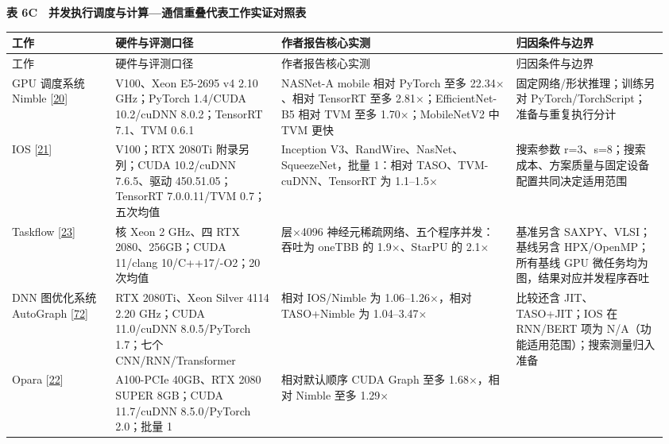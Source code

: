 \documentclass[UTF8,10.5pt,fontset=windows]{ctexart}
\newcommand{\TableTitle}[1]{\par\Needspace{5\baselineskip}\begingroup\centering\bfseries\fontsize{9.5}{13}\selectfont #1\par\endgroup\nobreak}
\begin{document}
\begin{landscape}
\begingroup
\fontsize{8.6}{11.8}\selectfont
\setlength{\tabcolsep}{2.5pt}
\setlength{\emergencystretch}{0.5\linewidth}
\renewcommand{\arraystretch}{1.10}
\TableTitle{\textbf{表 6C　并发执行调度与计算---通信重叠代表工作实证对照表}}
\begin{longtable}[c]{@{}>{\raggedright\arraybackslash}p{0.1536\linewidth}
>{\raggedright\arraybackslash}p{0.2400\linewidth}
>{\raggedright\arraybackslash}p{0.3456\linewidth}
>{\raggedright\arraybackslash}p{0.2208\linewidth}@{}}
\toprule
工作 & 硬件与评测口径 & 作者报告核心实测 & 归因条件与边界 \\
\midrule\endfirsthead
\toprule
工作 & 硬件与评测口径 & 作者报告核心实测 & 归因条件与边界 \\
\midrule\endhead
\bottomrule\endfoot
\bottomrule\endlastfoot
GPU 调度系统 Nimble {[}\protect\hyperlink{ref-kwon2020nimble}{20}{]} &
V100、Xeon E5-2695 v4 2.10 GHz；PyTorch 1.4/CUDA 10.2/cuDNN
8.0.2；TensorRT 7.1、TVM 0.6.1 & NASNet-A mobile 相对 PyTorch 至多
22.34\(\times\)、相对 TensorRT 至多 2.81\(\times\)；EfficientNet-B5 相对 TVM 至多
1.70\(\times\)；MobileNetV2 中 TVM 更快 & 固定网络/形状推理；训练另对
PyTorch/TorchScript；准备与重复执行分计 \\
IOS {[}\protect\hyperlink{ref-ding2021ios}{21}{]} & V100；RTX 2080Ti
附录另列；CUDA 10.2/cuDNN 7.6.5、驱动 450.51.05；TensorRT 7.0.0.11/TVM
0.7；五次均值 & Inception V3、RandWire、NasNet、SqueezeNet，批量 1：相对
TASO、TVM-cuDNN、TensorRT 为 1.1--1.5\(\times\) & 搜索参数
r=3、s=8；搜索成本、方案质量与固定设备配置共同决定适用范围 \\
Taskflow {[}\protect\hyperlink{ref-huang2022taskflow}{23}{]} & 40 核
Xeon 2 GHz、四 RTX 2080、256GB；CUDA 11/clang 10/C++17/-O2；20 次均值 &
1920 层\(\times\)4096 神经元稀疏网络、五个程序并发：吞吐为 oneTBB 的 1.9\(\times\)、StarPU
的 2.1\(\times\) & 基准另含 SAXPY、VLSI；基线另含 HPX/OpenMP；所有基线 GPU
微任务均为图，结果对应并发程序吞吐 \\
DNN 图优化系统 AutoGraph
{[}\protect\hyperlink{ref-zhao2023autograph}{72}{]} & RTX 2080Ti、Xeon
Silver 4114 2.20 GHz；CUDA 11.0/cuDNN 8.0.5/PyTorch 1.7；七个
CNN/RNN/Transformer & 相对 IOS/Nimble 为 1.06--1.26\(\times\)，相对 TASO+Nimble
为 1.04--3.47\(\times\) & 比较还含 JIT、TASO+JIT；IOS 在 RNN/BERT 项为
N/A（功能适用范围）；搜索测量归入准备 \\
Opara {[}\protect\hyperlink{ref-chen2025opara}{22}{]} & A100-PCIe
40GB、RTX 2080 SUPER 8GB；CUDA 11.7/cuDNN 8.5.0/PyTorch 2.0；批量 1 &
相对默认顺序 CUDA Graph 至多 1.68\(\times\)，相对 Nimble 至多 1.29\(\times\) &

\end{longtable}
\end{landscape}
\end{document}
